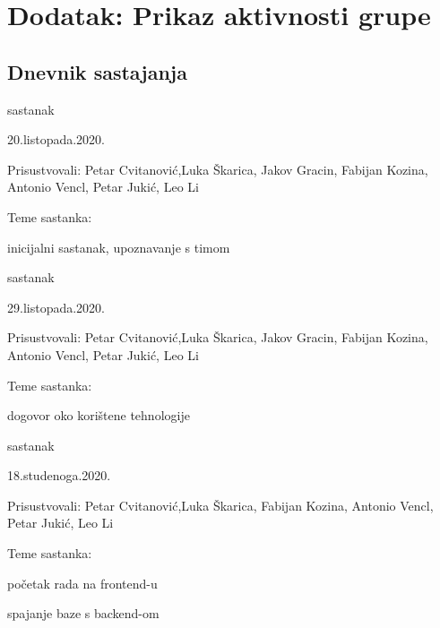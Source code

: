 \chapter*{Dodatak: Prikaz aktivnosti grupe}
		
		\section*{Dnevnik sastajanja}
		
		\begin{packed_enum}
			\item  sastanak
			
			\item[] \begin{packed_item}
				\item 20.listopada.2020.
				\item Prisustvovali: Petar Cvitanović,Luka Škarica, Jakov Gracin, Fabijan Kozina, Antonio Vencl, Petar Jukić, Leo Li
				\item Teme sastanka:
				\begin{packed_item}
					\item  inicijalni sastanak, upoznavanje s timom
				\end{packed_item}
			\end{packed_item}
			
			\item  sastanak
			\item[] \begin{packed_item}
					\item 29.listopada.2020.
				\item Prisustvovali: Petar Cvitanović,Luka Škarica, Jakov Gracin, Fabijan Kozina, Antonio Vencl, Petar Jukić, Leo Li
				\item Teme sastanka:
				\begin{packed_item}
					\item  dogovor oko korištene tehnologije
				\end{packed_item}
			\end{packed_item}
			
			\item  sastanak
			\item[] \begin{packed_item}
					\item 18.studenoga.2020.
				\item Prisustvovali: Petar Cvitanović,Luka Škarica, Fabijan Kozina, Antonio Vencl, Petar Jukić, Leo Li
				\item Teme sastanka:
				\begin{packed_item}
					\item  početak rada na frontend-u
					\item spajanje baze s backend-om
				\end{packed_item}
			\end{packed_item}
			

\end{packed_enum}
